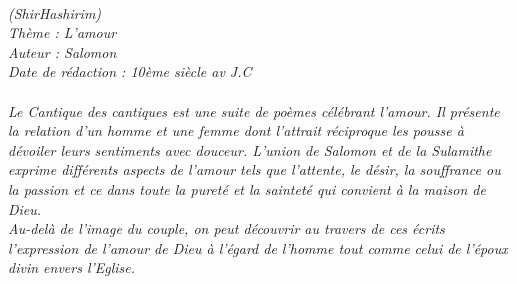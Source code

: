 \BFont
\noindent\hrulefill
{\footnotesize
\textit{
\bigskip
{\centering{}
\\(ShirHashirim)
\\Thème : L'amour
\\Auteur : Salomon
\\Date de rédaction : 10ème siècle av J.C\\}
}
\textit{
\\Le Cantique des cantiques est une suite de poèmes célébrant l’amour. Il présente la relation d’un homme et une femme dont l’attrait réciproque les pousse à dévoiler leurs sentiments avec douceur. L’union de Salomon et de la Sulamithe exprime différents aspects de l’amour tels que l’attente, le désir, la souffrance ou la passion et ce dans toute la pureté et la sainteté qui convient à la maison de Dieu.
\\Au-delà de l’image du couple, on peut découvrir au travers de ces écrits l’expression de l’amour de Dieu à l’égard de l’homme tout comme celui de l’époux divin envers l’Eglise.\bigskip
}
}
\par\nobreak\noindent\hrulefill
